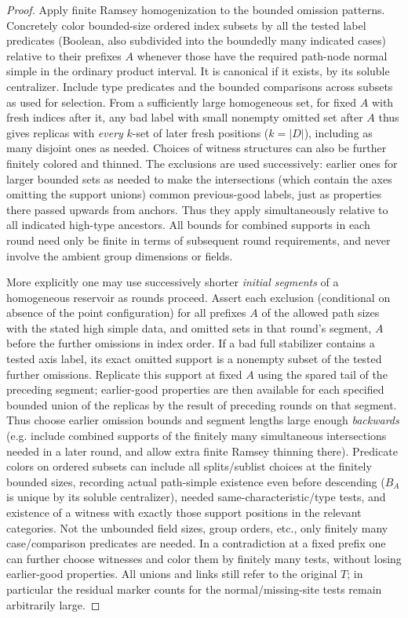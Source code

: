 \begin{proof}

Apply finite Ramsey homogenization to the bounded omission patterns. Concretely color bounded-size
ordered index subsets by all the tested label predicates (Boolean, also subdivided into the boundedly
many indicated cases) relative to their prefixes \(A\) whenever those have the required path-node normal
simple in the ordinary product interval. It is canonical if it exists, by its soluble centralizer.
Include type predicates and the bounded comparisons across subsets as used for selection. From a
sufficiently large homogeneous set, for fixed \(A\) with fresh indices after it, any bad label with small
nonempty omitted set after \(A\) thus gives replicas with \emph{every} \(k\)-set of later fresh positions
(\(k=|D|\)), including as many disjoint ones as needed. Choices of witness structures can also be further
finitely colored and thinned. The exclusions are used successively: earlier ones for larger bounded sets
as needed to make the intersections (which contain the axes omitting the support unions) common
previous-good labels, just as properties there passed upwards from anchors. Thus they apply
simultaneously relative to all indicated high-type ancestors. All bounds for combined supports in each
round need only be finite in terms of subsequent round requirements, and never involve the ambient group
dimensions or fields.

More explicitly one may use successively shorter \emph{initial segments} of a homogeneous reservoir as
rounds proceed. Assert each exclusion (conditional on absence of the point configuration) for all prefixes \(A\) of the
allowed path sizes with the stated high simple data, and omitted sets in that round's segment, \(A\)
before the further omissions in index order. If a bad full stabilizer contains a tested axis label, its
exact omitted support is a nonempty subset of the tested further omissions. Replicate this support at
fixed \(A\) using the spared tail of the preceding segment; earlier-good properties are then available
for each specified bounded union of the replicas by the result of preceding rounds on that segment. Thus
choose earlier omission bounds and segment lengths large enough \emph{backwards} (e.g. include combined
supports of the finitely many simultaneous intersections needed in a later round, and allow extra finite
Ramsey thinning there). Predicate colors on ordered subsets can include all splits/sublist choices at the
finitely bounded sizes, recording actual path-simple existence even before descending (\(B_A\) is unique
by its soluble centralizer), needed same-characteristic/type tests, and existence of a witness with
exactly those support positions in the relevant categories. Not the unbounded field sizes, group orders,
etc., only finitely many case/comparison predicates are needed. In a contradiction at a fixed prefix one
can further choose witnesses and color them by finitely many tests, without losing earlier-good
properties. All unions and links still refer to the original \(T\); in particular the residual marker
counts for the normal/missing-site tests remain arbitrarily large.

\end{proof}

